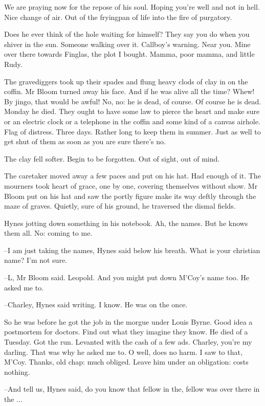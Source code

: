 We are praying now for the repose of his soul.
Hoping you're well and not in hell.
Nice change of air.
Out of the fryingpan of life into the fire of purgatory.

Does he ever think of the hole waiting for himself?
They say you do when you shiver in the sun.
Someone walking over it.
Callboy's warning.
Near you.
Mine over there towards Finglas, the plot I bought.
Mamma, poor mamma, and little Rudy.

The gravediggers took up their spades
and flung heavy clods of clay in on the coffin.
Mr Bloom turned away his face.
And if he was alive all the time?
Whew!
By jingo, that would be awful!
No, no:
he is dead, of course.
Of course he is dead.
Monday he died.
They ought to have some law to pierce the heart and make sure
or an electric clock or a telephone in the coffin
and some kind of a canvas airhole.
Flag of distress.
Three days.
Rather long to keep them in summer.
Just as well to get shut of them as soon as you are sure there's no.

The clay fell softer.
Begin to be forgotten.
Out of sight, out of mind.

The caretaker moved away a few paces and put on his hat.
Had enough of it.
The mourners took heart of grace,
one by one, covering themselves without show.
Mr Bloom put on his hat
and saw the portly figure make its way deftly through the maze of graves.
Quietly, sure of his ground,
he traversed the dismal fields.

Hynes jotting down something in his notebook.
Ah, the names.
But he knows them all.
No:
coming to me.

--I am just taking the names,
Hynes said below his breath.
What is your christian name?
I'm not sure.

--L,
Mr Bloom said.
Leopold.
And you might put down M'Coy's name too.
He asked me to.

--Charley, Hynes said writing.
I know.
He was on the  once.

So he was before he got the job in the morgue under Louis Byrne.
Good idea a postmortem for doctors.
Find out what they imagine they know.
He died of a Tuesday.
Got the run.
Levanted with the cash of a few ads.
Charley, you're my darling.
That was why he asked me to.
O well, does no harm.
I saw to that, M'Coy.
Thanks, old chap:
much obliged.
Leave him under an obligation:
costs nothing.

--And tell us,
Hynes said,
do you know that fellow in the,
fellow was over there in the ...

